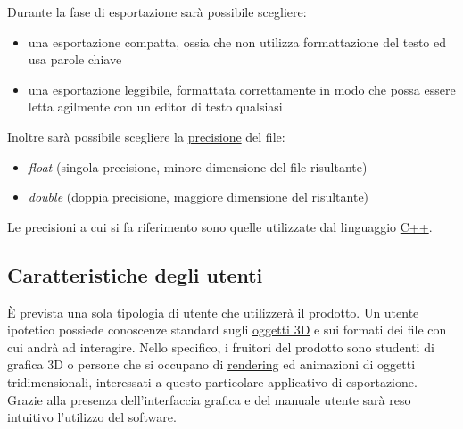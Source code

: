 Durante la fase di esportazione sarà possibile scegliere:
\begin{itemize}
\item una esportazione compatta, ossia che non utilizza formattazione del testo ed usa parole chiave
\item una esportazione leggibile, formattata correttamente in modo che possa essere letta agilmente con un editor di testo qualsiasi
\end{itemize}
Inoltre sarà possibile scegliere la \underline{precisione} del file:
\begin{itemize}
\item \emph{float} (singola precisione, minore dimensione del file \json{} risultante)
\item \emph{double} (doppia precisione, maggiore dimensione del \json {} risultante)
\end{itemize}
Le  precisioni a cui si fa riferimento sono quelle utilizzate dal linguaggio \underline{C++}.

\subsection{Caratteristiche degli utenti}
\label{2.3}
È prevista una sola tipologia di utente che utilizzerà il prodotto. Un utente ipotetico possiede conoscenze standard sugli \underline{oggetti 3D} e sui formati dei file con cui andrà ad interagire. Nello specifico, i fruitori del prodotto sono studenti di grafica 3D o persone che si occupano di \underline{rendering} ed animazioni di oggetti tridimensionali, interessati a questo particolare applicativo di esportazione. Grazie alla presenza dell'interfaccia grafica e del manuale utente sarà reso intuitivo l'utilizzo del software.

